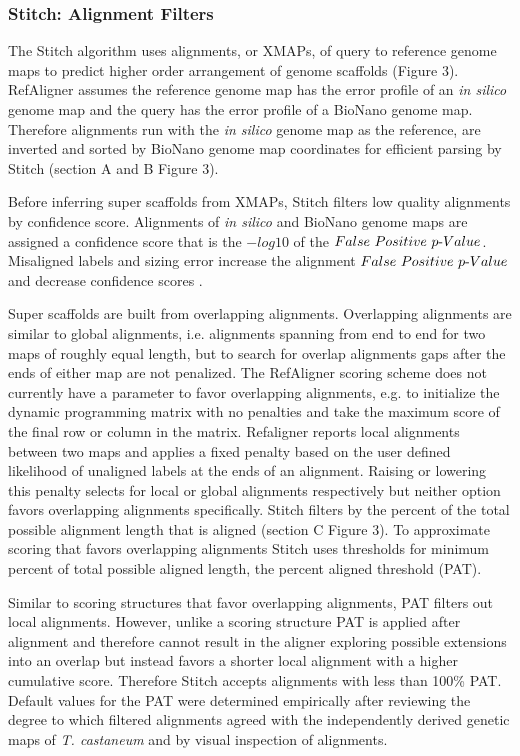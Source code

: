 \documentclass{bmcart}
\begin{document}
\subsubsection*{Stitch: Alignment Filters}

The Stitch algorithm uses alignments, or XMAPs, of query to reference genome maps to predict higher order arrangement of genome scaffolds  (Figure 3). RefAligner assumes the reference genome map has the error profile of an \textit{in silico} genome map and the query has the error profile of a BioNano genome map. Therefore alignments run with the \textit{in silico} genome map as the reference, are inverted and sorted by BioNano genome map coordinates for efficient parsing by Stitch (section A and B Figure 3). 

Before inferring super scaffolds from XMAPs, Stitch filters low quality alignments by confidence score. Alignments of \textit{in silico} and BioNano genome maps are assigned a confidence score that is the $-log10$ of the $False\textnormal{ }Positive\textnormal{ }p\textnormal{-}Value$. Misaligned labels and sizing error increase the alignment $False\textnormal{ }Positive\textnormal{ }p\textnormal{-}Value$ and decrease confidence scores \cite{ProbFP} .

Super scaffolds are built from overlapping alignments. Overlapping alignments are similar to global alignments, i.e. alignments spanning from end to end for two maps of roughly equal length, but to search for overlap alignments gaps after the ends of either map are not penalized. The RefAligner scoring scheme does not currently have a parameter to favor overlapping alignments, e.g. to initialize the dynamic programming matrix with no penalties and take the maximum score of the final row or column in the matrix. Refaligner reports local alignments between two maps and applies a fixed penalty based on the user defined likelihood of unaligned labels at the ends of an alignment. Raising or lowering this penalty selects for local or global alignments respectively but neither option favors overlapping alignments specifically. Stitch filters by the percent of the total possible alignment length that is aligned (section C Figure 3). To approximate scoring that favors overlapping alignments Stitch uses thresholds for minimum percent of total possible aligned length, the percent aligned threshold (PAT). 

Similar to scoring structures that favor overlapping alignments, PAT filters out local alignments. However, unlike a scoring structure PAT is applied after alignment and therefore cannot result in the aligner exploring possible extensions into an overlap but instead favors a shorter local alignment with a higher cumulative score. Therefore Stitch accepts alignments with less than 100\% PAT. Default values for the PAT were determined empirically after reviewing the degree to which filtered alignments agreed with the independently derived genetic maps of \textit{T. castaneum} and by visual inspection of alignments.
\end{document}
